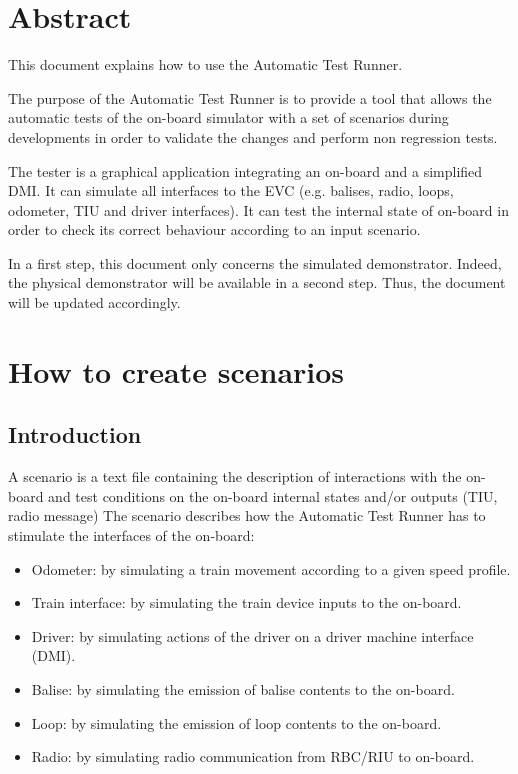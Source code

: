 \chapter{Abstract}

This document explains how to use the Automatic Test Runner.

The purpose of the Automatic Test Runner is to provide a tool that allows the automatic tests of the on-board simulator with a set of scenarios during developments in order to validate the changes and perform non regression tests.

The tester is a graphical application integrating an on-board and a simplified DMI. It can simulate all interfaces to the EVC (e.g. balises, radio, loops, odometer, TIU and driver interfaces). It can test the internal state of on-board in order to check its correct behaviour according to an input scenario.

In a first step, this document only concerns the simulated demonstrator. Indeed, the physical demonstrator will be available in a second step. Thus, the document will be updated accordingly.

\chapter{How to create scenarios}
\section{Introduction}

A scenario is a text file containing the description of interactions with the on-board and test conditions on the on-board internal states and/or outputs (TIU, radio message)
The scenario describes how the Automatic Test Runner has to stimulate the interfaces of the on-board:

\begin{itemize}
	\item Odometer: by simulating a train movement according to a given speed profile.
	\item Train interface: by simulating the train device inputs to the on-board.
	\item Driver: by simulating actions of the driver on a driver machine interface (DMI).
	\item Balise: by simulating the emission of balise contents to the on-board.
	\item Loop: by simulating the emission of loop contents to the on-board.
	\item Radio: by simulating radio communication from RBC/RIU to on-board.
\end{itemize}

